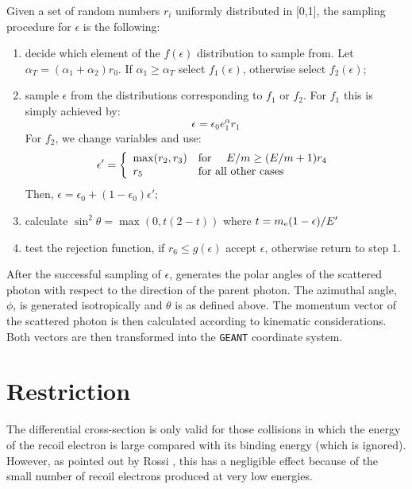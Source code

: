 Given a set of random numbers $r_i$ uniformly distributed in [0,1],
the sampling procedure for $\epsilon$ is the following:
\begin{enumerate}
\item
decide which element of the $f(\epsilon)$ distribution to sample from.
Let $\alpha_T = (\alpha_1+\alpha_2)r_0$. If $\alpha_1\geq\alpha_T$
select $f_1(\epsilon)$, otherwise select $f_2(\epsilon)$;
 
\item  sample $\epsilon$ from the distributions
corresponding to $f_1$ or $f_2$. For $f_1$ this is simply achieved by:
\[
\epsilon = \epsilon_0 e^\alpha_1 r_1
\]
For $f_2$, we change variables and use:
\[
\epsilon' = \left\{ \begin{array}{lll}
\max(r_2,r_3) & \mbox{for } & E/m \geq (E/m+1)r_4 \\
r_5           & \multicolumn{2}{l}{\mbox{for all other cases}}
 \end{array} \right.
\]
Then, $\epsilon = \epsilon_0+(1-\epsilon_0)\epsilon'$;
 
\item calculate $\sin^2\theta = \max(0,t(2-t))$ 
where $t=m_{\rm e}(1-\epsilon)/E'$ 

\item test the rejection function, if $r_6 \leq g(\epsilon)$ accept
$\epsilon$, otherwise return to step 1.
\end{enumerate}

After the successful sampling of $\epsilon$,  generates the
polar angles of the scattered photon with respect to the direction of
the parent photon. The azimuthal angle, $\phi$, is generated isotropically and
$\theta$ is as defined above. The momentum vector of the scattered
photon is then calculated according to kinematic considerations. Both
vectors are then transformed into the {\tt GEANT} coordinate system.

\section{Restriction}
 
The differential cross-section is only valid for those
collisions in which the energy of the recoil electron is large compared
with its binding energy (which is ignored). However, as pointed out by
Rossi \cite{bib-ROSS}, this has a negligible effect 
because of the small number of
recoil electrons produced at very low energies.
